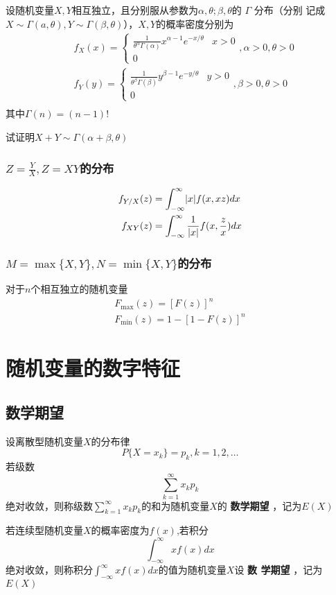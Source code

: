 \documentclass[11pt]{article}
\begin{document}
\begin{examplle}[]
设随机变量\(X,Y\)相互独立，且分别服从参数为\(\alpha,\theta;\beta,\theta\)的  \(\Gamma\) 分布（分别
记成\(X\sim\Gamma(a,\theta),Y\sim\Gamma(\beta,\theta)\)），\(X,Y\)的概率密度分别为
\begin{align*}
&f_X(x)=
\begin{cases}
\frac{1}{\theta^\alpha\Gamma(\alpha)}x^{\alpha-1}e^{-x/\theta}&x>0\\
0&
\end{cases},\alpha>0,\theta>0\\
&f_Y(y)=
\begin{cases}
\frac{1}{\theta^\beta\Gamma(\beta)}y^{\beta-1}e^{-y/\theta}&y>0\\
0&
\end{cases},\beta>0,\theta>0\\
\end{align*}
其中\(\Gamma(n)=(n-1)!\)

试证明\(X+Y\sim \Gamma(\alpha+\beta,\theta)\)
\end{examplle}
\subsubsection{\(Z=\frac{Y}{X},Z=XY\)的分布}
\label{sec:org6f5814b}
\begin{align*}
f_{Y/X}(z)&=\int_{-\infty}^\infty \abs{x}f(x,xz)dx\\
f_{XY}(z)&=\int_{-\infty}^\infty\frac{1}{\abs{x}}f(x,\frac{z}{x})dx
\end{align*}
\subsubsection{\(M=\max\{X,Y\},N=\min\{X,Y\}\)的分布}
\label{sec:orgb43cc9c}
对于\(n\)个相互独立的随机变量
\begin{gather*}
F_{\max}(z)=[F(z)]^n\\
F_{\min}(z)=1-[1-F(z)]^n
\end{gather*}
\section{随机变量的数字特征}
\label{sec:org4ecbcd5}
\subsection{数学期望}
\label{sec:orgda7b59e}
\begin{definition}[]
设离散型随机变量\(X\)的分布律
\begin{equation*}
P\{X=x_k\}=p_k,k=1,2,\dots
\end{equation*}
若级数
\begin{equation*}
\sum_{k=1}^\infty x_kp_k
\end{equation*}
绝对收敛，则称级数\(\sum_{k=1}^\infty x_kp_k\)的和为随机变量\(X\)的 \textbf{数学期望}
，记为\(E(X)\)

若连续型随机变量\(X\)的概率密度为\(f(x)\),若积分
\begin{equation*}
\int_{-\infty}^\infty xf(x)dx
\end{equation*}
绝对收敛，则称积分\(\int_{-\infty}^\infty xf(x)dx\)的值为随机变量\(X\)设 \textbf{数
学期望} ，记为 \(E(X)\)
\end{definition}
\end{document}
